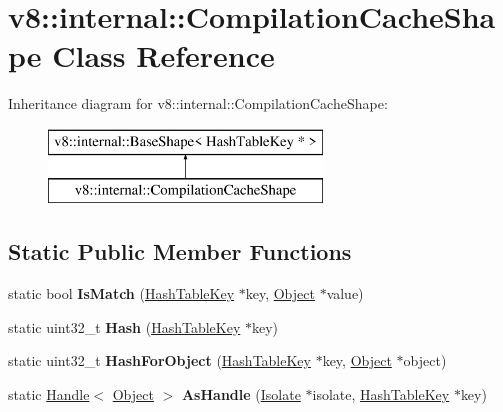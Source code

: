 \hypertarget{classv8_1_1internal_1_1_compilation_cache_shape}{}\section{v8\+:\+:internal\+:\+:Compilation\+Cache\+Shape Class Reference}
\label{classv8_1_1internal_1_1_compilation_cache_shape}
Inheritance diagram for v8\+:\+:internal\+:\+:Compilation\+Cache\+Shape\+:\begin{figure}[H]
\begin{center}
\leavevmode
\includegraphics[height=2.000000cm]{classv8_1_1internal_1_1_compilation_cache_shape}
\end{center}
\end{figure}
\subsection*{Static Public Member Functions}
\begin{DoxyCompactItemize}
\item 
\hypertarget{classv8_1_1internal_1_1_compilation_cache_shape_a613407fc3120722d21293dfe69f34521}{}static bool {\bfseries Is\+Match} (\hyperlink{classv8_1_1internal_1_1_hash_table_key}{Hash\+Table\+Key} $\ast$key, \hyperlink{classv8_1_1internal_1_1_object}{Object} $\ast$value)\label{classv8_1_1internal_1_1_compilation_cache_shape_a613407fc3120722d21293dfe69f34521}

\item 
\hypertarget{classv8_1_1internal_1_1_compilation_cache_shape_acf5dcd22e8ab7845ab33d4f0401bb312}{}static uint32\+\_\+t {\bfseries Hash} (\hyperlink{classv8_1_1internal_1_1_hash_table_key}{Hash\+Table\+Key} $\ast$key)\label{classv8_1_1internal_1_1_compilation_cache_shape_acf5dcd22e8ab7845ab33d4f0401bb312}

\item 
\hypertarget{classv8_1_1internal_1_1_compilation_cache_shape_a92530449c3ec57237cc140519cb66130}{}static uint32\+\_\+t {\bfseries Hash\+For\+Object} (\hyperlink{classv8_1_1internal_1_1_hash_table_key}{Hash\+Table\+Key} $\ast$key, \hyperlink{classv8_1_1internal_1_1_object}{Object} $\ast$object)\label{classv8_1_1internal_1_1_compilation_cache_shape_a92530449c3ec57237cc140519cb66130}

\item 
\hypertarget{classv8_1_1internal_1_1_compilation_cache_shape_a272f412497695e4cb08f4c04063c6714}{}static \hyperlink{classv8_1_1internal_1_1_handle}{Handle}$<$ \hyperlink{classv8_1_1internal_1_1_object}{Object} $>$ {\bfseries As\+Handle} (\hyperlink{classv8_1_1internal_1_1_isolate}{Isolate} $\ast$isolate, \hyperlink{classv8_1_1internal_1_1_hash_table_key}{Hash\+Table\+Key} $\ast$key)\label{classv8_1_1internal_1_1_compilation_cache_shape_a272f412497695e4cb08f4c04063c6714}

\end{DoxyCompactItemize}
